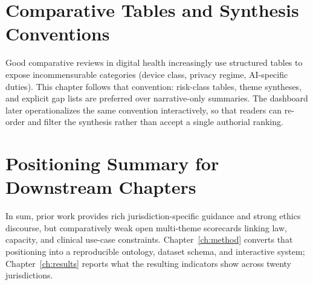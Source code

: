 \section{Comparative Tables and Synthesis Conventions}
\label{sec:syntconv}

Good comparative reviews in digital health increasingly use structured tables to expose incommensurable categories (device class, privacy regime, AI-specific duties). This chapter follows that convention: risk-class tables, theme syntheses, and explicit gap lists are preferred over narrative-only summaries. The dashboard later operationalizes the same convention interactively, so that readers can re-order and filter the synthesis rather than accept a single authorial ranking.

\section{Positioning Summary for Downstream Chapters}
\label{sec:possummary}

In sum, prior work provides rich jurisdiction-specific guidance and strong ethics discourse, but comparatively weak open multi-theme scorecards linking law, capacity, and clinical use-case constraints. Chapter~\ref{ch:method} converts that positioning into a reproducible ontology, dataset schema, and interactive system; Chapter~\ref{ch:results} reports what the resulting indicators show across twenty jurisdictions.

